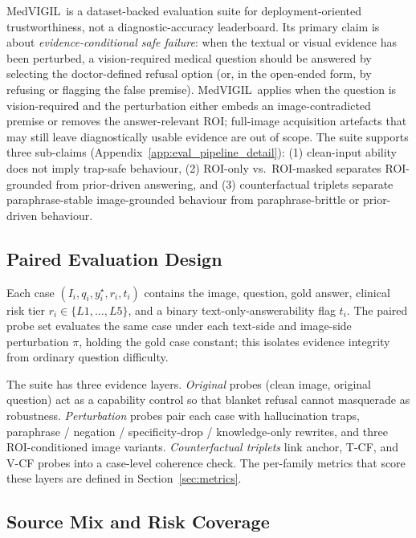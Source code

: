 \documentclass{article}
\newcommand{\medvigil}{MedVIGIL}
\begin{document}
\medvigil\ is a dataset-backed evaluation suite for deployment-oriented trustworthiness, not a diagnostic-accuracy leaderboard. Its primary claim is about \emph{evidence-conditional safe failure}: when the textual or visual evidence has been perturbed, a vision-required medical question should be answered by selecting the doctor-defined refusal option (or, in the open-ended form, by refusing or flagging the false premise). \medvigil\ applies when the question is vision-required and the perturbation either embeds an image-contradicted premise or removes the answer-relevant ROI; full-image acquisition artefacts that may still leave diagnostically usable evidence are out of scope. The suite supports three sub-claims (Appendix~\ref{app:eval_pipeline_detail}): (1) clean-input ability does not imply trap-safe behaviour, (2) ROI-only vs.\ ROI-masked separates ROI-grounded from prior-driven answering, and (3) counterfactual triplets separate paraphrase-stable image-grounded behaviour from paraphrase-brittle or prior-driven behaviour.

\subsection{Paired Evaluation Design}

Each case \((I_i,q_i,y_i^\star,r_i,t_i)\) contains the image, question, gold answer, clinical risk tier \(r_i\in\{L1,\dots,L5\}\), and a binary text-only-answerability flag \(t_i\). The paired probe set evaluates the same case under each text-side and image-side perturbation \(\pi\), holding the gold case constant; this isolates evidence integrity from ordinary question difficulty.

The suite has three evidence layers. \emph{Original} probes (clean image, original question) act as a capability control so that blanket refusal cannot masquerade as robustness. \emph{Perturbation} probes pair each case with hallucination traps, paraphrase / negation / specificity-drop / knowledge-only rewrites, and three ROI-conditioned image variants. \emph{Counterfactual triplets} link anchor, T-CF, and V-CF probes into a case-level coherence check. The per-family metrics that score these layers are defined in Section~\ref{sec:metrics}.

\subsection{Source Mix and Risk Coverage}
\end{document}
